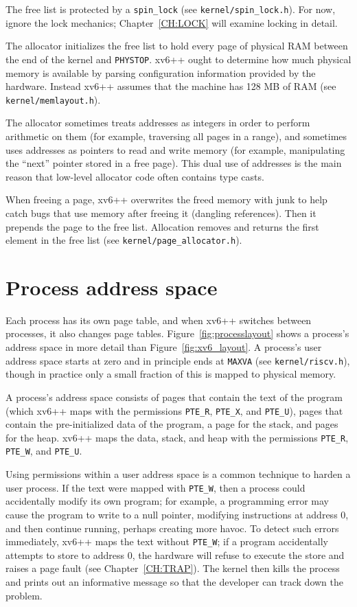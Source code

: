 The free list is protected by a \lstinline{spin_lock} (see \texttt{kernel/spin\_lock.h}).
For now, ignore the lock mechanics; Chapter~\ref{CH:LOCK} will examine locking
in detail.

The allocator initializes the free list to hold every page of physical RAM
between the end of the kernel and \lstinline{PHYSTOP}. xv6++ ought to determine
how much physical memory is available by parsing configuration information
provided by the hardware. Instead xv6++ assumes that the machine has 128 MB of RAM
(see \texttt{kernel/memlayout.h}).

The allocator sometimes treats addresses as integers in order to perform arithmetic
on them (for example, traversing all pages in a range), and sometimes uses addresses
as pointers to read and write memory (for example, manipulating the ``next'' pointer
stored in a free page). This dual use of addresses is the main reason that low-level
allocator code often contains type casts.

When freeing a page, xv6++ overwrites the freed memory with junk to help catch bugs
that use memory after freeing it (dangling references). Then it prepends the page to
the free list. Allocation removes and returns the first element in the free list
(see \texttt{kernel/page\_allocator.h}).

\section{Process address space}

Each process has its own page table, and when xv6++ switches between
processes, it also changes page tables. Figure~\ref{fig:processlayout}
shows a process's address space in more detail than
Figure~\ref{fig:xv6_layout}. A process's user address space starts at
zero and in principle ends at \texttt{MAXVA} (see \texttt{kernel/riscv.h}),
though in practice only a small fraction of this is mapped to physical
memory.

A process's address space consists of pages that contain the text of the
program (which xv6++ maps with the permissions \lstinline{PTE_R},
\lstinline{PTE_X}, and \lstinline{PTE_U}), pages that contain the
pre-initialized data of the program, a page for the stack, and pages for
the heap. xv6++ maps the data, stack, and heap with the permissions
\lstinline{PTE_R}, \lstinline{PTE_W}, and \lstinline{PTE_U}.

Using permissions within a user address space is a common technique to
harden a user process. If the text were mapped with \lstinline{PTE_W},
then a process could accidentally modify its own program; for example, a
programming error may cause the program to write to a null pointer,
modifying instructions at address 0, and then continue running, perhaps
creating more havoc. To detect such errors immediately, xv6++ maps the
text without \lstinline{PTE_W}; if a program accidentally attempts to
store to address 0, the hardware will refuse to execute the store and
raises a page fault (see Chapter~\ref{CH:TRAP}). The kernel then kills
the process and prints out an informative message so that the developer
can track down the problem.

